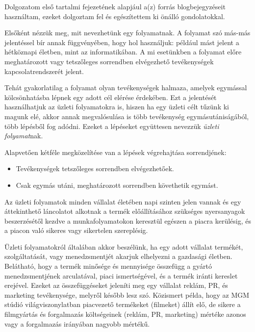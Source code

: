 

Dolgozatom első tartalmi fejezetének alapjául a(z) \cite{xflower} forrás blogbejegyzéseit használtam, ezeket dolgoztam fel és egészítettem ki önálló gondolatokkal.


Elsőként nézzük meg, mit nevezhetünk egy folyamatnak. A folyamat szó más-más jelentéssel bír annak függvényében, hogy hol használjuk: például mást jelent a hétköznapi életben, mint az informatikában. A mi esetünkben a folyamat előre meghatározott vagy tetszőleges sorrendben elvégezhető tevékenységek kapcsolatrendszerét jelent.

Tehát gyakorlatilag a folyamat olyan tevékenységek halmaza, amelyek egymással kölcsönhatásba lépnek egy adott cél elérése érdekében. Ezt a jelentését használhatjuk az üzleti folyamatokra is, hiszen ha egy üzleti célt tűzünk ki magunk elé, akkor annak megvalósulása is több tevékenység egymásutániságából, több lépésből fog adódni. Ezeket a lépéseket együttesen nevezzük \textit{üzleti folyamat}nak.

Alapvetően kétféle megközelítése van a lépések végrehajtása sorrendjének:

\begin{itemize}
\item Tevékenységek tetszőleges sorrendben elvégezhetőek.
\item Csak egymás utáni, meghatározott sorrendben követhetik egymást.
\end{itemize}

Az üzleti folyamatok minden vállalat életében napi szinten jelen vannak és egy áttekinthető láncolatot alkotnak a termék előállításához szükséges nyersanyagok beszerzésétől kezdve a munkafolyamatokon keresztül egészen a piacra kerülésig, és a piacon való sikeres vagy sikertelen szereplésig.

Üzleti folyamatokról általában akkor beszélünk, ha egy adott vállalat termékét, szolgáltatását, vagy menedzsmentjét akarjuk elhelyezni a gazdasági életben. Belátható, hogy a termék minősége és mennyisége összefügg a gyártó menedzsmentjének arculatával, piaci ismertségével, és a termék iránti kereslet erejével. Ezeket az összefüggéseket jeleníti meg egy vállalat reklám, PR, és marketing tevékenysége, melyről később lesz szó. Közismert példa, hogy az MGM stúdió világviszonylatban piacvezető termékeket (filmeket) állít elő, de sikere a filmgyártás és forgalmazás költségeinek (reklám, PR, marketing) mértéke azonos vagy a forgalmazás irányában nagyobb mértékű.

